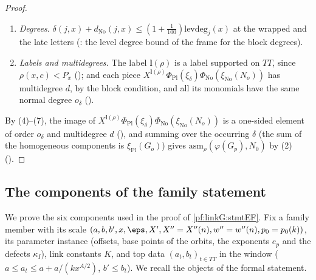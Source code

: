 \begin{proof}
\begin{enumerate}[label=(\arabic*)]
letter of the segment) give, in the same way, that the valuation of $A$
on the positions up to $x$ is at least $\tau(j,u+1)\ge M_x+m_*$. Finally $\theta^*_\kappa\ge\frac12B_j(x)$ gives
$\tau(j,u)\ge\frac12B_j(x)-\frac12s_U(j,u)-60c'\ge\frac12B_j(x)-s_U(j,u)$, the threshold condition. These are the conditions defining
$X'_j$; the degrees of $A$ and $B$ give the homogeneity and the order bound.
\item \emph{Degrees.} $\delta(j,x)+d_{\mathrm{No}}(j,x)\le(1+\frac1{100})\mathrm{levdeg}_j(x)$ at the wrapped and the late letters
(: the level degree bound of the frame for the block degrees).
\item \emph{Labels and multidegrees.} The label $\mathbf l(\rho)$ is a label supported on $TT$, since $\rho(x,c)<P_x$
(); and each piece
$X^{\mathbf l(\rho)}\Phi_{\mathrm{Pl}}(\xi_\delta)\Phi_{\mathrm{No}}(\xi_{\mathrm{No}}(N_o))$ has multidegree $d$, by the block condition, and all
its monomials have the same normal degree $o_\delta$ ().
\end{enumerate}
By (4)--(7), the image of $X^{\mathbf l(\rho)}\Phi_{\mathrm{Pl}}(\xi_\delta)\Phi_{\mathrm{No}}(\xi_{\mathrm{No}}(N_o))$ is a one-sided element of order
$o_\delta$ and multidegree $d$ (), and summing over the occurring $\delta$
(the sum of the homogeneous components is $\xi_{\mathrm{Pl}}(G_o)$) gives $\mathrm{asm}_\rho(\varphi(G_p),N_0)$ by (2)
().
\end{proof}


\subsection{The components of the family statement}\label{sec:pf:linkG:famcomp}

We prove the six components used in the proof of \cref{pf:linkG:stmtEF}. Fix a family member with its scale
$(a,b,b',x,\eps,X',X''=X''(n),w''=w''(n),p_0=p_0(k))$, its parameter instance (offsets, base points of the orbits, the
exponents $e_p$ and the defects $\kappa_I$), link constants $K$, and top data $(a_t,b_t)_{t\in TT}$ in the window
($a\le a_t\le a+a/(kx^{A/2})$, $b'\le b_t$). We recall the objects of the formal statement.


